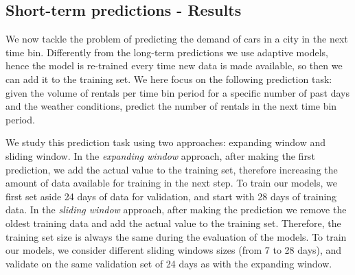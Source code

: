 
\subsection{Short-term predictions -  Results}

We now tackle the problem of predicting the demand of cars in a city in the next time bin. 
Differently from the long-term predictions we use adaptive models, hence the model is re-trained every time new data is made available, so then we can add it to the training set.
We here focus on the following prediction task: given the volume of rentals per time bin period for a specific number of past days and the weather conditions, predict the number of rentals in the next time bin period.

We study this prediction task using two approaches: expanding window and sliding window. 
In the \emph{expanding window} approach, after making the first prediction, we add the actual value to the training set, therefore increasing the amount of data available for training in the next step. 
To train our models, we first set aside 24 days of data for validation, and start with 28 days of training data. 
In the \emph{sliding window} approach, after making the prediction we remove the oldest training data and add the actual value to the training set. Therefore, the training set size is always the same during the evaluation of the models. To train our models, we consider different sliding windows sizes (from 7 to 28 days), and validate on the same validation set of 24 days as with the expanding window. 


